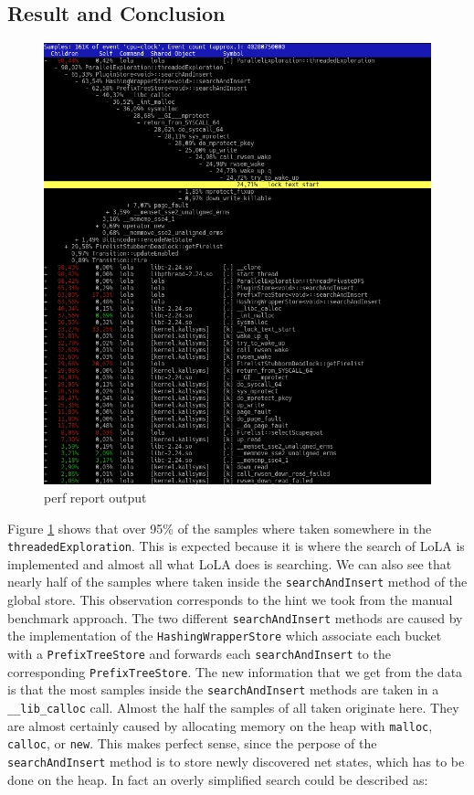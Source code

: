 \subsection{Result and Conclusion}
\begin{figure}
    \centering
    \includegraphics[width=\textwidth]{pictures/perfReportSample.png}
    \caption{perf report output}
    \label{perf_record_sample}
\end{figure}
Figure \ref{perf_record_sample} shows that over 95\% of the samples where taken somewhere in the \texttt{threadedExploration}. This is expected because it is where the search of LoLA is implemented and almost all what LoLA does is searching. We can also see that nearly half of the samples where taken inside the \texttt{searchAndInsert} method of the global store. This observation corresponds to the hint we took from the manual benchmark approach. The two different \texttt{searchAndInsert} methods are caused by the implementation of the \texttt{HashingWrapperStore} which associate each bucket with a \texttt{PrefixTreeStore} and forwards each \texttt{searchAndInsert} to the corresponding \texttt{PrefixTreeStore}.
The new information that we get from the data is that the most samples inside the \texttt{searchAndInsert} methods are taken in a \texttt{\_\_lib\_calloc} call. Almost the half the samples of all taken originate here. They are almost certainly caused by allocating memory on the heap with \texttt{malloc}, \texttt{calloc}, or \texttt{new}. This makes perfect sense, since the perpose of the \texttt{searchAndInsert} method is to store newly discovered net states, which has to be done on the heap. In fact an overly simplified search could be described as:

